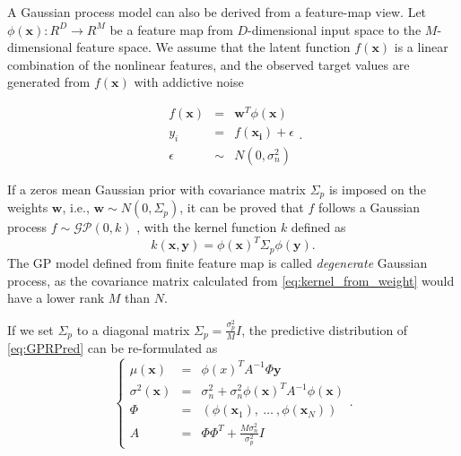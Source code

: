 A Gaussian process model can also be derived from a feature-map view. Let $\phi(\bm{x}): R^D \rightarrow R^M$ be a feature map from $D$-dimensional input space to the $M$-dimensional feature space. We assume that the latent function $f(\bm{x})$ is a linear combination of the nonlinear features, and the observed target values are generated from $f(\bm{x})$ with addictive noise

\begin{equation}
    \label{eq:weightspace}
    \begin{array}{lll}
        f(\bm{x}) &=&    \bm{w}^T \phi(\bm{x})   \\
        y_i       &=&    f(\bm{x_i}) + \epsilon  \\
        \epsilon  &\sim& N(0, \sigma_n^2)
    \end{array}.
\end{equation}

If a zeros mean Gaussian prior with covariance matrix $\Sigma_p$ is imposed on the weights $\bm{w}$, i.e., $\bm{w} \sim N(0, \Sigma_p)$, it can be proved that $f$ follows a Gaussian process $f \sim \mathcal{GP}(0, k)$ \cite{GPML}, with the kernel function $k$ defined as
\begin{equation}
    \label{eq:kernel_from_weight}
    k(\bm{x}, \bm{y}) = \phi(\bm{x})^T \Sigma_p \phi(\bm{y}).
\end{equation}
The GP model defined from finite feature map is called \emph{degenerate} Gaussian process, as the covariance matrix calculated from \eqref{eq:kernel_from_weight} would have a lower rank $M$ than $N$.


If we set $\Sigma_p$ to a diagonal matrix $\Sigma_p = \frac{\sigma_p^2}{M} I$, the predictive distribution of \eqref{eq:GPRPred} can be re-formulated as
\begin{equation}
    \left\{
        \begin{array}{lll}
            \mu(\bm{x})      &= & \phi(x)^T A^{-1} \Phi \bm{y} \\
            \sigma^2(\bm{x}) &= & \sigma_n^2 + \sigma_n^2 \phi(\bm{x})^T A^{-1} \phi(\bm{x}) \\
            \Phi             &= & (\phi(\bm{x}_1),~\dots~,\phi(\bm{x}_N)) \\
            A                &= & \Phi \Phi^T + \frac{M \sigma_n^2}{\sigma_p^2} I
        \end{array}.
    \right.
    \label{eq:DegeneratePred}
\end{equation}


